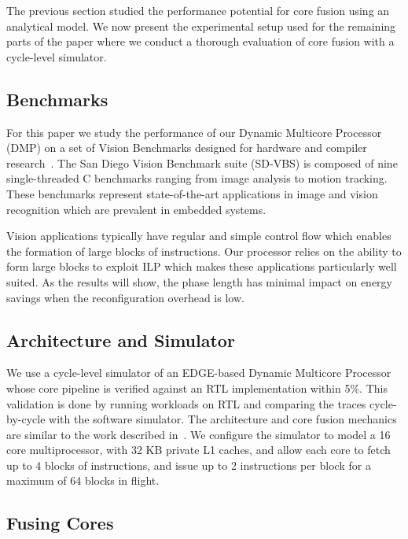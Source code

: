 The previous section studied the performance potential for core fusion using an analytical model.
We now present the experimental setup used for the remaining parts of the paper where we conduct a thorough evaluation of core fusion with a cycle-level simulator.

\subsection{Benchmarks}

For this paper we study the performance of our Dynamic Multicore Processor (DMP) on a set of Vision Benchmarks designed for hardware and compiler research~\cite{sdvbs}.
The San Diego Vision Benchmark suite (SD-VBS) is composed of nine single-threaded C benchmarks ranging from image analysis to motion tracking.
These benchmarks represent state-of-the-art applications in image and vision recognition which are prevalent in embedded systems.

Vision applications typically have regular and simple control flow which enables the formation of large blocks of instructions.
Our processor relies on the ability to form large blocks to exploit ILP which makes these applications particularly well suited.
As the results will show, the phase length has minimal impact on energy savings when the reconfiguration overhead is low.

\subsection{Architecture and Simulator}

We use a cycle-level simulator of an EDGE-based Dynamic Multicore Processor~\cite{e2} whose core pipeline is verified against an RTL implementation within 5\%. 
This validation is done by running workloads on RTL and comparing the traces cycle-by-cycle with the software simulator.
The architecture and core fusion mechanics are similar to the work described in~\cite{kim2007tflex,putnam2010e2}.
We configure the simulator to model a 16 core multiprocessor, with 32 KB private L1 caches, and allow each core to fetch up to 4 blocks of instructions, 
and issue up to 2 instructions per block for a maximum of 64 blocks in flight.


\subsection{Fusing Cores} \label{sec:coresufion}

